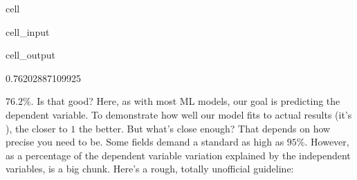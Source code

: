 \documentclass[letterpaper,10pt,english]{jupyterBook}
\begin{document}
\begin{sphinxuseclass}{cell}\begin{sphinxVerbatimInput}

\begin{sphinxuseclass}{cell_input}
\begin{sphinxVerbatim}[commandchars=\\\{\}]
   

 
\end{sphinxVerbatim}

\end{sphinxuseclass}\end{sphinxVerbatimInput}
\begin{sphinxVerbatimOutput}

\begin{sphinxuseclass}{cell_output}
\begin{sphinxVerbatim}[commandchars=\\\{\}]
0.76202887109925
\end{sphinxVerbatim}

\end{sphinxuseclass}\end{sphinxVerbatimOutput}

\end{sphinxuseclass}
\sphinxAtStartPar
\(76.2\%\). Is that good? Here, as with most ML models, our goal is predicting the dependent variable. To demonstrate how well our model fits to actual results (it’s ), the closer to \(1\) the better. But what’s close enough? That depends on how precise you need to be. Some fields demand a standard as high as \(95\%\). However, as a percentage of the dependent variable variation explained by the independent variables,  is a big chunk. Here’s a rough, totally unofficial guideline:
\end{document}
